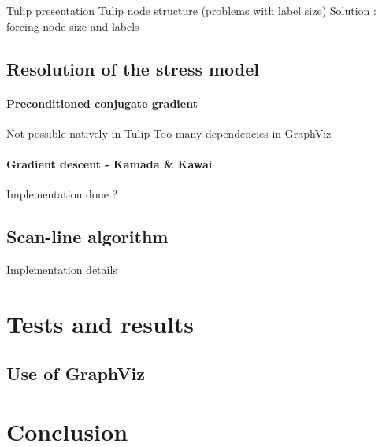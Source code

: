 \documentclass[12pt]{report}
\begin{document}
Tulip presentation
Tulip node structure (problems with label size)
Solution : forcing node size and labels

\section{Resolution of the stress model}
\subsubsection{Preconditioned conjugate gradient}
Not possible natively in Tulip
Too many dependencies in GraphViz
\subsubsection{Gradient descent - Kamada \& Kawai}
Implementation done ?
\section{Scan-line algorithm}
Implementation details
\chapter{Tests and results}

\section{Use of GraphViz}

\chapter{Conclusion}



\end{document}
